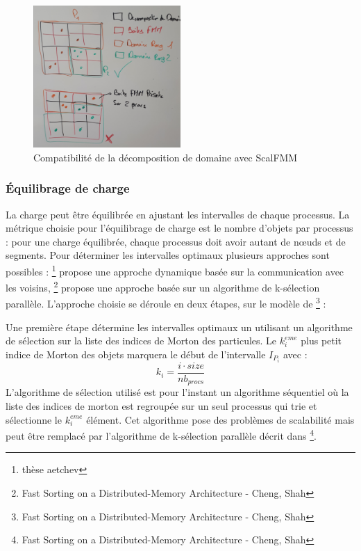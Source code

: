 \begin{figure}[]
\centering
\includegraphics[width=0.5\textwidth]{img/domaindecomposition_smaller_octree}
\caption{Compatibilité de la décomposition de domaine avec ScalFMM}
\label{fig:domaindecomposition_smaller_octree}
\end{figure}

\subsubsection{Équilibrage de charge}

La charge peut être équilibrée en ajustant les intervalles de chaque processus. La métrique choisie pour l'équilibrage de charge est le nombre d'objets par processus : pour une charge équilibrée, chaque processus doit avoir autant de nœuds et de segments. Pour déterminer les intervalles optimaux plusieurs approches sont possibles : \footnote{thèse aetchev} propose une approche dynamique basée sur la communication avec les voisins, \footnote{Fast Sorting on a Distributed-Memory Architecture - Cheng, Shah} propose une approche basée sur un algorithme de k-sélection parallèle. L'approche choisie se déroule en deux étapes, sur le modèle de \footnote{Fast Sorting on a Distributed-Memory Architecture - Cheng, Shah} :

Une première étape détermine les intervalles optimaux un utilisant un algorithme de sélection sur la liste des indices de Morton des particules. Le $k_i^{eme}$ plus petit indice de Morton des objets marquera le début de l'intervalle $I_{P_i}$ avec : 
\begin{equation}
    k_i=\frac{i \cdot size}{nb_{procs}}
\end{equation}
L'algorithme de sélection utilisé est pour l'instant un algorithme séquentiel où la liste des indices de morton est regroupée sur un seul processus qui trie et sélectionne le $k_i^{eme}$ élément. Cet algorithme pose des problèmes de scalabilité mais peut être remplacé par l'algorithme de k-sélection parallèle décrit dans \footnote{Fast Sorting on a Distributed-Memory Architecture - Cheng, Shah}.

